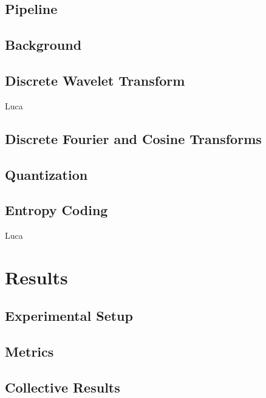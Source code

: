 \documentclass[conference]{IEEEtran}
\begin{document}
\subsection{Pipeline}
\label{methodsec:pipeline}

\subsection{Background}
\label{methodsec:background}

\subsection{Discrete Wavelet Transform}
Luca

\label{methodsec:DWT}

\subsection{Discrete Fourier and Cosine Transforms}

\label{methodsec:fourier}



\label{methodsec:sp}

\subsection{Quantization}
\label{methodsec:quant}


\subsection{Entropy Coding}
\label{methodsec:entropy}


Luca


\section{Results}
\label{sec:results}

\subsection{Experimental Setup}


\subsection{Metrics}

\label{resultssec:metrics}

\subsection{Collective Results}
\label{resultssec:col}

\end{document}
